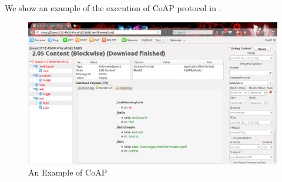 We show an example of the execution of CoAP protocol in .
\begin{figure}[h!]
	\center
	\includegraphics[width=1\textwidth]{fig/CoapExample.png}
	\caption{An Example of CoAP}
	\label{Fig: An Example of CoAP}
\end{figure}


